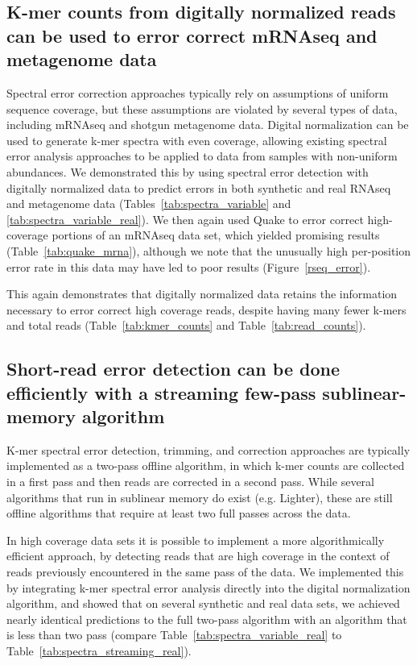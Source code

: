 \documentclass{article}
\begin{document}
\subsection{K-mer counts from digitally normalized reads can be used to error correct mRNAseq and metagenome data}

Spectral error correction approaches typically rely on assumptions of
uniform sequence coverage, but these assumptions are violated by
several types of data, including mRNAseq and shotgun metagenome data.
Digital normalization can be used to generate k-mer spectra with even
coverage, allowing existing spectral error analysis approaches to be
applied to data from samples with non-uniform abundances.  We
demonstrated this by using spectral error detection with digitally
normalized data to predict errors in both synthetic and real RNAseq
and metagenome data (Tables~\ref{tab:spectra_variable} and
\ref{tab:spectra_variable_real}).  We then again used Quake to error
correct high-coverage portions of an mRNAseq data set, which yielded
promising results (Table~\ref{tab:quake_mrna}), although we note
that the unusually high per-position error rate in this data
may have led to poor results (Figure~\ref{rseq_error}).

This again demonstrates that digitally normalized data retains the
information necessary to error correct high coverage reads, despite
having many fewer k-mers and total reads (Table~\ref{tab:kmer_counts}
and Table~\ref{tab:read_counts}).


\subsection{Short-read error detection can be done efficiently with a streaming few-pass sublinear-memory algorithm}

K-mer spectral error detection, trimming, and correction approaches
are typically implemented as a two-pass offline algorithm, in which
k-mer counts are collected in a first pass and then reads are
corrected in a second pass.  While several algorithms that run in
sublinear memory do exist (e.g. Lighter), these are still offline
algorithms that require at least two full passes across the data.

In high coverage data sets it is possible to implement a more
algorithmically efficient approach, by detecting reads that are high
coverage in the context of reads previously encountered in the same
pass of the data.  We implemented this by integrating k-mer spectral
error analysis directly into the digital normalization algorithm, and
showed that on several synthetic and real data sets, we achieved
nearly identical predictions to the full two-pass algorithm with an
algorithm that is less than two pass (compare
Table~\ref{tab:spectra_variable_real} to
Table~\ref{tab:spectra_streaming_real}).
\end{document}
